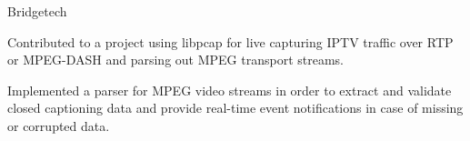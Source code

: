 \begin{experience}{Bridgetech}{}
    \item{Contributed to a project using libpcap for live capturing IPTV traffic over RTP or MPEG-DASH and parsing out MPEG transport streams.}
    \item{Implemented a parser for MPEG video streams in order to extract and validate closed captioning data and provide real-time event notifications in case of missing or corrupted data.}
\end{experience}




